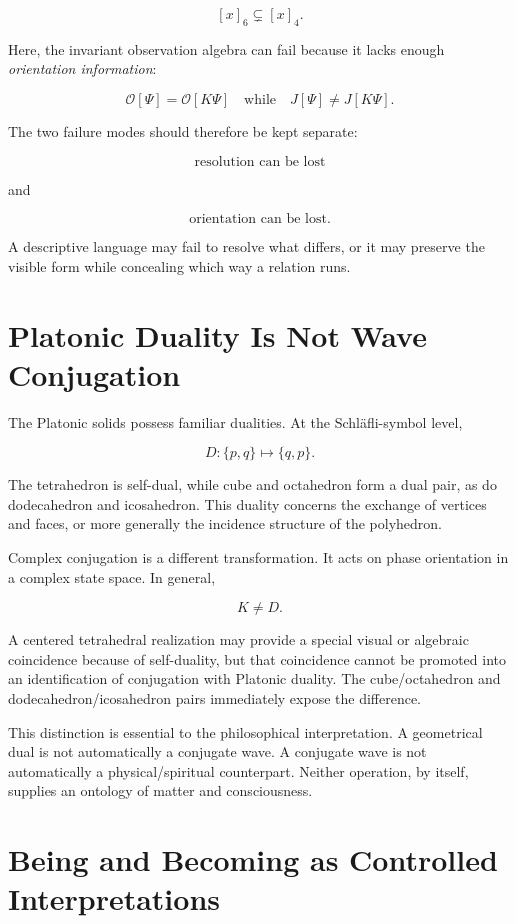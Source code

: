 \[
[x]_6\subsetneq[x]_4.
\]

Here, the invariant observation algebra can fail because it lacks enough \emph{orientation information}:

\[
\mathcal O[\Psi]=\mathcal O[K\Psi]
\quad\text{while}\quad
J[\Psi]\neq J[K\Psi].
\]

The two failure modes should therefore be kept separate:

\[
\boxed{
\text{resolution can be lost}
}
\]

and

\[
\boxed{
\text{orientation can be lost}.
}
\]

A descriptive language may fail to resolve what differs, or it may preserve the visible form while concealing which way a relation runs.

\section{Platonic Duality Is Not Wave Conjugation}

The Platonic solids possess familiar dualities. At the Schläfli-symbol level,

\[
D:\{p,q\}\longmapsto\{q,p\}.
\]

The tetrahedron is self-dual, while cube and octahedron form a dual pair, as do dodecahedron and icosahedron. This duality concerns the exchange of vertices and faces, or more generally the incidence structure of the polyhedron.

Complex conjugation is a different transformation. It acts on phase orientation in a complex state space. In general,

\[
\boxed{K\neq D}.
\]

A centered tetrahedral realization may provide a special visual or algebraic coincidence because of self-duality, but that coincidence cannot be promoted into an identification of conjugation with Platonic duality. The cube/octahedron and dodecahedron/icosahedron pairs immediately expose the difference.

This distinction is essential to the philosophical interpretation. A geometrical dual is not automatically a conjugate wave. A conjugate wave is not automatically a physical/spiritual counterpart. Neither operation, by itself, supplies an ontology of matter and consciousness.

\section{Being and Becoming as Controlled Interpretations}

